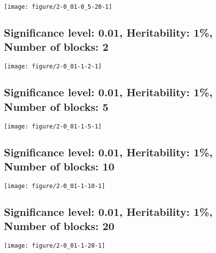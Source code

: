 \documentclass[11pt,letter]{article}\usepackage[]{graphicx}\usepackage[]{color}
\makeatletter
\def\maxwidth{ %
  \ifdim\Gin@nat@width>\linewidth
    \linewidth
  \else
    \Gin@nat@width
  \fi
}
\newenvironment{knitrout}{}{} %
\makeatother
\begin{document}
\begin{knitrout}
\color{fgcolor}
\texttt{[image: figure/2-0\_01-0\_5-20-1]} 

\end{knitrout}

\newpage
\subsection{Significance level: 0.01, Heritability: 1\%, Number of blocks: 2}

\begin{knitrout}
\color{fgcolor}
\texttt{[image: figure/2-0\_01-1-2-1]} 

\end{knitrout}

\newpage
\subsection{Significance level: 0.01, Heritability: 1\%, Number of blocks: 5}

\begin{knitrout}
\color{fgcolor}
\texttt{[image: figure/2-0\_01-1-5-1]} 

\end{knitrout}

\newpage
\subsection{Significance level: 0.01, Heritability: 1\%, Number of blocks: 10}

\begin{knitrout}
\color{fgcolor}
\texttt{[image: figure/2-0\_01-1-10-1]} 

\end{knitrout}

\newpage
\subsection{Significance level: 0.01, Heritability: 1\%, Number of blocks: 20}

\begin{knitrout}
\color{fgcolor}
\texttt{[image: figure/2-0\_01-1-20-1]} 

\end{knitrout}
\end{document}
